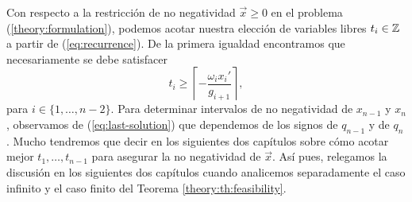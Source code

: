 Con respecto a la restricción de no negatividad $\vec{x} \geq 0$ en el problema
(\ref{theory:formulation}), podemos acotar nuestra elección de variables libres $t_i \in \mathbb{Z}$ a
partir de (\ref{eq:recurrence}). De la primera igualdad encontramos que necesariamente se debe
satisfacer
\begin{equation}
	\label{eq:param-lb}
	t_i \geq \left\lceil -\frac{\omega_ix_i'}{g_{i + 1}} \right\rceil,
\end{equation}
para $i \in \lbrace 1, \ldots, n - 2\rbrace$. Para determinar intervalos de no negatividad de
$x_{n-1}$ y $x_n$, observamos de (\ref{eq:last-solution}) que dependemos de los signos
de $q_{n-1}$ y de $q_n$. Mucho tendremos que decir en los siguientes dos capítulos sobre
cómo acotar mejor $t_1, \ldots, t_{n-1}$ para asegurar la no negatividad de $\vec{x}$. Así pues,
relegamos la discusión en los siguientes dos capítulos cuando analicemos separadamente el caso
infinito y el caso finito del Teorema \ref{theory:th:feasibility}.

